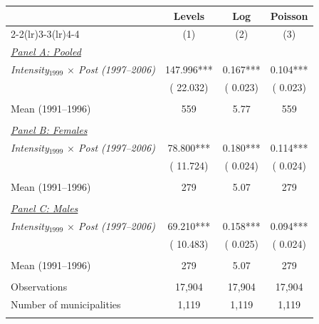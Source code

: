 \begin{tabular}{lccc} \hline \hline
& Levels & Log & Poisson \\ 
\cmidrule(lr){2-2}\cmidrule(lr){3-3}\cmidrule(lr){4-4}
& \multicolumn{1}{c}{(1)} & \multicolumn{1}{c}{(2)} & \multicolumn{1}{c}{(3)} \\ \toprule
\underline{\textit{Panel A: Pooled}}  \\ 
\textit{Intensity$_{1999}$ $\times$ Post (1997--2006)} &      147.996*** &        0.167*** &        0.104*** \\ 
  & (      22.032) & (       0.023) & (       0.023) \\ 
  & & &  \\ 
Mean (1991--1996)  &          559 &         5.77 &          559 \\ 
  & & &  \\ 
\underline{\textit{Panel B: Females}}  \\ 
\textit{Intensity$_{1999}$ $\times$ Post (1997--2006)}  &       78.800*** &        0.180*** &        0.114*** \\ 
  & (      11.724) & (       0.024) & (       0.024) \\ 
  & & &  \\ 
Mean (1991--1996)  &          279 &         5.07 &          279 \\ 
  & & &  \\ 
\underline{\textit{Panel C: Males}}  \\ 
\textit{Intensity$_{1999}$ $\times$ Post (1997--2006)} &       69.210*** &        0.158*** &        0.094*** \\ 
  & (      10.483) & (       0.025) & (       0.024) \\ 
  & & &  \\ 
Mean (1991--1996) &          279 &         5.07 &          279 \\ 
  & & &  \\ 
Observations &       17,904 &       17,904 &       17,904 \\ 
Number of municipalities &        1,119 &        1,119 &        1,119 \\ 
  & & & \\ 
\bottomrule
\end{tabular}